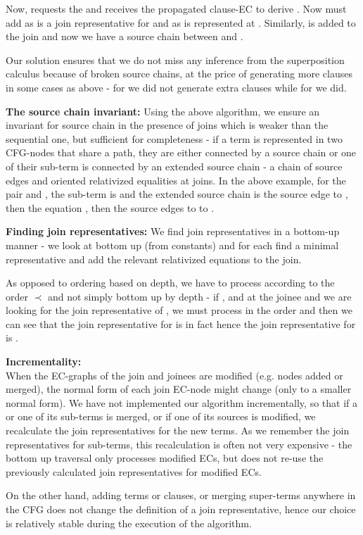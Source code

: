 Now,  requests the \GFA{}  and receives the propagated clause-EC   to derive
. Now  must add  as  is a join representative for  and as  is represented at . Similarly,  is added to the join and now we have a source chain between  and .

Our solution ensures that we do not miss any inference from the superposition calculus because of broken source chains, at the price of generating more clauses in some cases as above - for  we did not generate extra clauses while for  we did.

\textbf{The source chain invariant:}
Using the above algorithm, we ensure an invariant for source chain in the presence of joins which is weaker than the sequential one, but sufficient for completeness - if a term is represented in two CFG-nodes that share a path, they are either connected by a source chain or one of their sub-term is connected by an extended source chain - a chain of source edges and oriented relativized equalities at joins.
In the above example, for the pair  and , the sub-term is  and the extended source chain is the source edge  to , then the equation , then the source edges  to  to .

\textbf{Finding join representatives:}
We find join representatives in a bottom-up manner - we look at  bottom up (from constants) and for each \GT{} find a minimal representative and add the relevant relativized equations to the join. 

As opposed to ordering based on depth, we have to process \GTs{} according to the order $\prec$ and not simply bottom up by depth - 
if , and at the joinee  and we are looking for the join representative of , we must process \GTs{} in the order \m{[a], [f(a)], [f(f(a))], [c]} and then we can see that the join representative for \m{[c]} is in fact \m{[f(f(a))]} hence the join representative for  is \m{[g(f(f(a)))]}.

\textbf{Incrementality:}\\
When the EC-graphs of the join and joinees are modified (e.g. nodes added or merged), the normal form of each join EC-node might change (only to a smaller normal form). We have not implemented our algorithm incrementally, so that if a \GT{} or one of its sub-terms is merged, or if one of its sources is modified, we recalculate the join representatives for the new terms. As we remember the join representatives for sub-terms, this recalculation is often not very expensive - the bottom up traversal only processes modified ECs, but does not re-use the previously calculated join representatives for modified ECs.

On the other hand, adding terms or clauses, or merging super-terms anywhere in the CFG does not change the definition of a join representative, hence our choice is relatively stable during the execution of the algorithm.


\newpage
